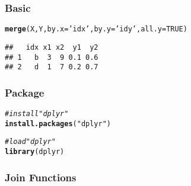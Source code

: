 \documentclass[12pt]{beamer}\usepackage[]{graphicx}\usepackage[]{color}
\makeatletter
\newcommand{\hlnum}[1]{\textcolor[rgb]{0.686,0.059,0.569}{#1}}%
\newcommand{\hlstr}[1]{\textcolor[rgb]{0.192,0.494,0.8}{#1}}%
\newcommand{\hlcom}[1]{\textcolor[rgb]{0.678,0.584,0.686}{\textit{#1}}}%
\newcommand{\hlstd}[1]{\textcolor[rgb]{0.345,0.345,0.345}{#1}}%
\newcommand{\hlkwc}[1]{\textcolor[rgb]{0.333,0.667,0.333}{#1}}%
\newcommand{\hlkwd}[1]{\textcolor[rgb]{0.737,0.353,0.396}{\textbf{#1}}}%
\newenvironment{kframe}{%
 \def\at@end@of@kframe{}%
 \ifinner\ifhmode%
  \def\at@end@of@kframe{\end{minipage}}%
  \begin{minipage}{\columnwidth}%
 \fi\fi%
 \def\FrameCommand##1{\hskip\@totalleftmargin \hskip-\fboxsep
 \colorbox{shadecolor}{##1}\hskip-\fboxsep
     \hskip-\linewidth \hskip-\@totalleftmargin \hskip\columnwidth}%
 \MakeFramed {\advance\hsize-\width
   \@totalleftmargin\z@ \linewidth\hsize
   \@setminipage}}%
 {\par\unskip\endMakeFramed%
 \at@end@of@kframe}
\newenvironment{knitrout}{}{} %
\makeatother
\begin{document}

\begin{frame}[fragile]
\frametitle{Basic }

\begin{knitrout}\footnotesize
{}\color{fgcolor}\begin{kframe}
\begin{alltt}
\hlkwd{merge}\hlstd{(X, Y,} \hlkwc{by.x} \hlstd{=} \hlstr{'idx'}\hlstd{,} \hlkwc{by.y} \hlstd{=} \hlstr{'idy'}\hlstd{,} \hlkwc{all.y} \hlstd{=} \hlnum{TRUE}\hlstd{)}
\end{alltt}
\begin{verbatim}
##   idx x1 x2  y1  y2
## 1   b  3  9 0.1 0.6
## 2   d  1  7 0.2 0.7
\end{verbatim}
\end{kframe}
\end{knitrout}

\end{frame}


\begin{frame}
\begin{center}
\Huge{}
\end{center}
\end{frame}


\begin{frame}[fragile]
\frametitle{Package }

\begin{knitrout}\footnotesize
{}\color{fgcolor}\begin{kframe}
\begin{alltt}
\hlcom{# install "dplyr"}
\hlkwd{install.packages}\hlstd{(}\hlstr{"dplyr"}\hlstd{)}

\hlcom{# load "dplyr"}
\hlkwd{library}\hlstd{(dplyr)}
\end{alltt}
\end{kframe}
\end{knitrout}



\end{frame}


\begin{frame}[fragile]
\frametitle{Join Functions}

\bi
  \item {}
  \item {}
  \item {}
  \item {}
  \item {}
  \item {}
\ei

\end{frame}
\end{document}
